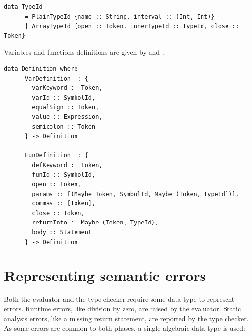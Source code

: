 \documentclass[UdineBachThesis,american,11pt]{PhdThesis}
\begin{document}
  \begin{lstlisting}[gobble=4,basicstyle=\ttfamily\small]
    data TypeId
      = PlainTypeId {name :: String, interval :: (Int, Int)}
      | ArrayTypeId {open :: Token, innerTypeId :: TypeId, close :: Token}
  \end{lstlisting}

  Variables and functions definitions are given by \lstinline@VarDefinition@ and
  \lstinline@FunDefinition@.

  \begin{lstlisting}[gobble=4,basicstyle=\ttfamily\small]
    data Definition where
      VarDefinition :: {
        varKeyword :: Token,
        varId :: SymbolId,
        equalSign :: Token,
        value :: Expression,
        semicolon :: Token
      } -> Definition

      FunDefinition :: {
        defKeyword :: Token,
        funId :: SymbolId,
        open :: Token,
        params :: [(Maybe Token, SymbolId, Maybe (Token, TypeId))],
        commas :: [Token],
        close :: Token,
        returnInfo :: Maybe (Token, TypeId),
        body :: Statement
      } -> Definition
  \end{lstlisting}

  \section{Representing semantic errors}

  Both the evaluator and the type checker require some data type to represent
  errors. Runtime errors, like division by zero, are raised by the evaluator.
  Static analysis errors, like a missing return statement, are reported by the
  type checker. As some errors are common to both phases, a single algebraic
  data type is used:
\end{document}
